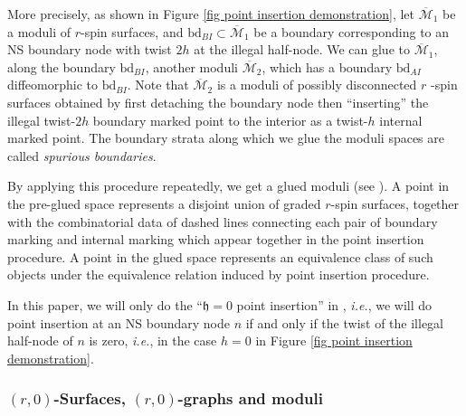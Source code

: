 \documentclass[11pt]{amsart}
\theoremstyle{definition}
\theoremstyle{remark}
\newcommand{\<}{\left<}
\renewcommand{\>}{\right>}
\numberwithin{equation}{section}
\def\Mbar{{\overline{\mathcal M}}}
\def\h{{\mathfrak h}}
\begin{document}
More %
precisely, as shown in Figure \ref{fig point insertion demonstration}, let $\Mbar_1$ be a moduli of $r$-spin surfaces, and $\text{bd}_{BI}\subset \Mbar_1$ be a boundary corresponding to an NS boundary node with twist $2h$ at the illegal half-node. We can glue to $\Mbar_1$, along the boundary $\text{bd}_{BI}$, another %
moduli $\Mbar_2$, which %
has a boundary $\text{bd}_{AI}$ diffeomorphic to $\text{bd}_{BI}$. Note that $\Mbar_2$ is a moduli of possibly disconnected $r$%
-spin surfaces obtained %
by first detaching the %
boundary node then %
``inserting'' the illegal twist-$2h$ boundary marked point to the interior as a twist-$h$ internal marked point. The boundary strata along which we glue the moduli spaces are called \emph{spurious boundaries}.

By applying this %
procedure repeatedly, we %
get a glued moduli (see \cite[\S 4.6]{TZ1}). A point in the pre-glued space represents a disjoint union of graded $r$-spin surfaces, together with the combinatorial data of dashed lines connecting each pair of boundary marking and internal marking which appear together in the point insertion procedure. A point in the glued space represents an equivalence class of such objects under the equivalence relation induced by point insertion procedure.

In this paper, we will only do the ``$\h=0$ point insertion'' in \cite{TZ1}, \textit{i.e.}, we will  do point insertion at an NS boundary node $n$ if and only if the twist of the illegal half-node of $n$ is zero, \textit{i.e.}, in the case $h=0$ in %
Figure \ref{fig point insertion demonstration}.



\subsubsection{$(r,0)$-Surfaces, $(r,0)$-graphs and moduli}
\end{document}
